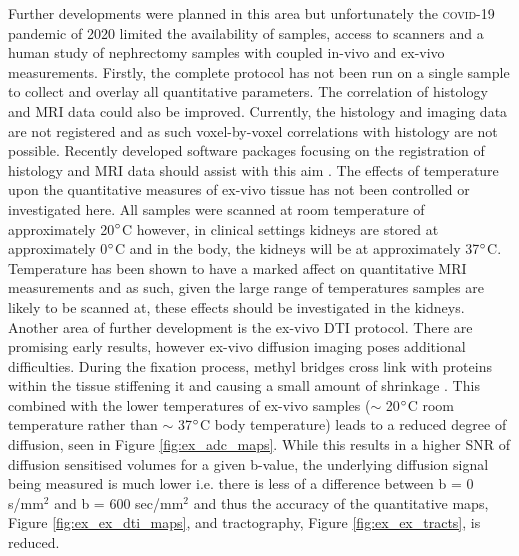Further developments were planned in this area but unfortunately the \textsc{covid}-19 pandemic of 2020 limited the availability of samples, access to scanners and a human study of nephrectomy samples with coupled in-vivo and ex-vivo measurements. Firstly, the complete protocol has not been run on a single sample to collect and overlay all quantitative parameters. The correlation of histology and \ac{MRI} data could also be improved. Currently, the histology and imaging data are not registered and as such voxel-by-voxel correlations with histology are not possible. Recently developed software packages focusing on the registration of histology and \ac{MRI} data should assist with this aim \cite{huszar_tensor_2019}. The effects of temperature upon the quantitative measures of ex-vivo tissue has not been controlled or investigated here. All samples were scanned at room temperature of approximately 20$\degree$C however, in clinical settings kidneys are stored at approximately 0$\degree$C and in the body, the kidneys will be at approximately 37$\degree$C. Temperature has been shown to have a marked affect on quantitative \ac{MRI} measurements \cite{keenan_multi-site_2016} and as such, given the large range of temperatures samples are likely to be scanned at, these effects should be investigated in the kidneys. Another area of further development is the ex-vivo \ac{DTI} protocol. There are promising early results, however ex-vivo diffusion imaging poses additional difficulties. During the fixation process, methyl bridges cross link with proteins within the tissue stiffening it and causing a small amount of shrinkage \cite{thavarajah_chemical_2012}. This combined with the lower temperatures of ex-vivo samples ($\sim$ 20$\degree$C room temperature rather than $\sim$ 37$\degree$C body temperature) leads to a reduced degree of diffusion, seen in Figure \ref{fig:ex_adc_maps}. While this results in a higher \ac{SNR} of diffusion sensitised volumes for a given b-value, the underlying diffusion signal being measured is much lower i.e. there is less of a difference between b = 0 s/mm$^2$ and b = 600 sec/mm$^2$ and thus the accuracy of the quantitative maps, Figure \ref{fig:ex_ex_dti_maps}, and tractography, Figure \ref{fig:ex_ex_tracts}, is reduced.

